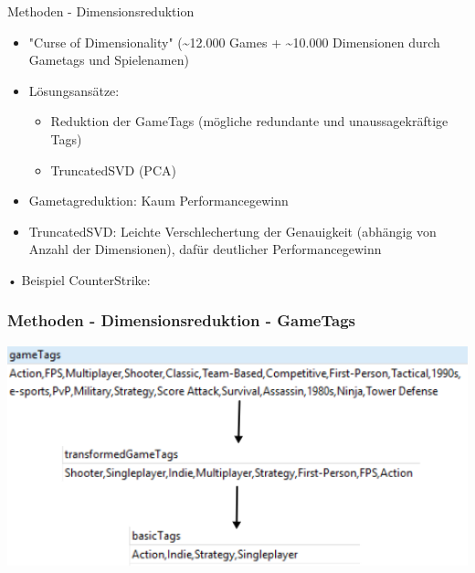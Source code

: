 \documentclass[12pt]{beamer}
\begin{document}
\begin{frame}{Methoden - Dimensionsreduktion}
	\begin{itemize}
	\item "Curse of Dimensionality" (\textasciitilde 12.000 Games + \textasciitilde 10.000 Dimensionen durch Gametags und Spielenamen)
	\item Lösungsansätze:
		\begin{itemize}
		\item Reduktion der GameTags (mögliche redundante und unaussagekräftige Tags)
		\item TruncatedSVD (PCA)
		\end{itemize}
	\item Gametagreduktion: Kaum Performancegewinn
	\item TruncatedSVD: Leichte Verschlechertung der Genauigkeit (abhängig von Anzahl der Dimensionen), dafür deutlicher Performancegewinn
	\end{itemize}
\end{frame}

\begin{frame}{•}
	Beispiel CounterStrike: \newline \newblock
	\frametitle{Methoden - Dimensionsreduktion - GameTags}
	\includegraphics[width=1\textwidth]{img/cs_gametag_reduction.png}
\end{frame}	
\end{document}
